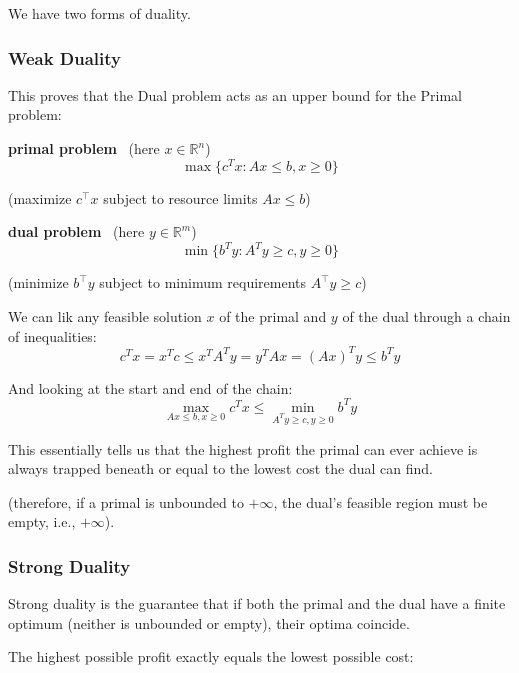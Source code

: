 \documentclass[a4paper, 11pt]{report}
\begin{document}
We have two forms of duality.
\subsubsection{Weak Duality}
This proves that the Dual problem acts as an upper bound for the Primal problem:

\noindent
\colorbox{blue!5}{%
  \begin{minipage}[t][\height][t]{0.45\textwidth}
      \textbf{primal problem} \ (here $x \in \mathbb{R}^n$)\\[2mm]
      $$\max \{c^T x : Ax \le b, x \ge 0\}$$
      
      (maximize $c^\top x$ subject to resource limits $Ax \leq b$)
  \end{minipage}%
}%
\hfill
\colorbox{green!7}{%
  \begin{minipage}[t][\height][t]{0.45\textwidth}
      \textbf{dual problem} \ (here $y \in \mathbb{R}^m$)\\[2mm]
      $$\min \{b^T y : A^T y \ge c, y \ge 0\}$$

      (minimize $b^\top y$ subject to minimum requirements $A^\top y \geq c$)
  \end{minipage}%
}
\vspace{4mm}

We can lik any feasible solution $x$ of the primal and $y$ of the dual through a chain of inequalities:
$$ c^T x = x^T c \le x^T A^T y = y^T A x = (Ax)^T y \le b^T y $$

And looking at the start and end of the chain:
$$ \max_{Ax \le b, x \ge 0} c^T x \le \min_{A^T y \ge c, y \ge 0} b^T y $$

\begin{gframe}{}
This essentially tells us that the highest profit the primal can ever achieve is always trapped beneath or equal to the lowest cost the dual can find. 

(therefore, if a primal is unbounded to $+\infty$, the dual's feasible region must be empty, i.e., $+\infty$).
\end{gframe}

\subsubsection{Strong Duality}
Strong duality is the guarantee that if both the primal and the dual have a finite optimum (neither is unbounded or empty), their optima coincide. 

The highest possible profit exactly equals the lowest possible cost:
\end{document}
